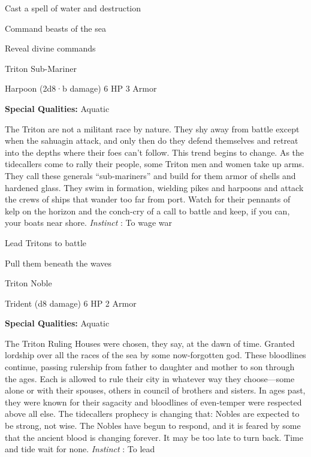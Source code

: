 \startitemize[1,packed]

\item Cast a spell of water and destruction

 
\item Command beasts of the sea

 
\item Reveal divine commands


\stopitemize
 
\startMonsterName
Triton Sub-Mariner	 
\stopMonsterName
 

Harpoon (2d8·b damage)	6 HP	3 Armor

 


 
\startMonsterQualities
{\bf Special Qualities:}  Aquatic
\stopMonsterQualities
 
\startMonsterDescription
The Triton are not a militant race by nature. They shy away from battle except when the sahuagin attack, and only then do they defend themselves and retreat into the depths where their foes can’t follow. This trend begins to change. As the tidecallers come to rally their people, some Triton men and women take up arms. They call these generals “sub-mariners” and build for them armor of shells and hardened glass. They swim in formation, wielding pikes and harpoons and attack the crews of ships that wander too far from port. Watch for their pennants of kelp on the horizon and the conch-cry of a call to battle and keep, if you can, your boats near shore. {\em Instinct} : To wage war
\stopMonsterDescription
 
\startitemize[1,packed]

\item Lead Tritons to battle

 
\item Pull them beneath the waves


\stopitemize
 
\startMonsterName
Triton Noble	 
\stopMonsterName
 

Trident (d8 damage)	6 HP	2 Armor

 


 
\startMonsterQualities
{\bf Special Qualities:}  Aquatic
\stopMonsterQualities
 
\startMonsterDescription
The Triton Ruling Houses were chosen, they say, at the dawn of time. Granted lordship over all the races of the sea by some now-forgotten god. These bloodlines continue, passing rulership from father to daughter and mother to son through the ages. Each is allowed to rule their city in whatever way they choose—some alone or with their spouses, others in council of brothers and sisters. In ages past, they were known for their sagacity and bloodlines of even-temper were respected above all else. The tidecallers prophecy is changing that: Nobles are expected to be strong, not wise. The Nobles have begun to respond, and it is feared by some that the ancient blood is changing forever. It may be too late to turn back. Time and tide wait for none. {\em Instinct} : To lead
\stopMonsterDescription
 

